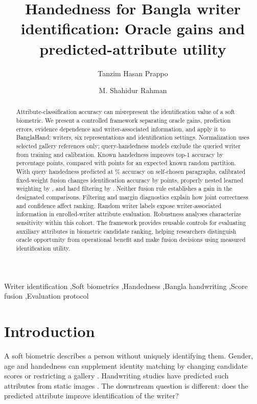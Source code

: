 \documentclass[5p,times,twocolumn,final,numbers,sort&compress]{elsarticle}
\begin{document}
\begin{frontmatter}
\title{Handedness for Bangla writer identification: Oracle gains and predicted-attribute utility}
\author[sust]{Tanzim Hasan Prappo}
\author[sust]{M. Shahidur Rahman}
\begin{abstract}
Attribute-classification accuracy can misrepresent the identification value of a soft biometric. We present a controlled framework separating oracle gains, prediction errors, evidence dependence and writer-associated information, and apply it to BanglaHand: \rWriters{} writers, six representations and \rSettings{} identification settings. Normalization uses selected gallery references only; query-handedness models exclude the queried writer from training and calibration. Known handedness improves top-1 accuracy by \rKnownGain{} percentage points, compared with \rRandomKnownGain{} points for an expected known random partition. With query handedness predicted at \rHandOwn\% accuracy on self-chosen paragraphs, calibrated fixed-weight fusion changes identification accuracy by \rFusionGain{} points, properly nested learned weighting by \rNestedGain{}, and hard filtering by \rFilterGain{}. Neither fusion rule establishes a gain in the designated comparisons. Filtering and margin diagnostics explain how joint correctness and confidence affect ranking. Random writer labels expose writer-associated information in enrolled-writer attribute evaluation. Robustness analyses characterize sensitivity within this cohort. The framework provides reusable controls for evaluating auxiliary attributes in biometric candidate ranking, helping researchers distinguish oracle opportunity from operational benefit and make fusion decisions using measured identification utility.
\end{abstract}
\begin{keyword}
Writer identification \sep Soft biometrics \sep Handedness \sep Bangla handwriting \sep Score fusion \sep Evaluation protocol
\end{keyword}
\end{frontmatter}

\section{Introduction}
A soft biometric describes a person without uniquely identifying them. Gender, age and handedness can supplement identity matching by changing candidate scores or restricting a gallery \cite{jain2004soft,dantcheva2016soft}. Handwriting studies have predicted such attributes from static images \cite{liwicki2011gender,siddiqi2015gender,bouadjenek2016soft,almaadeed2016handedness,morera2018handedness,rahmanian2021handedness}. The downstream question is different: does the predicted attribute improve identification of the writer?
\end{document}
